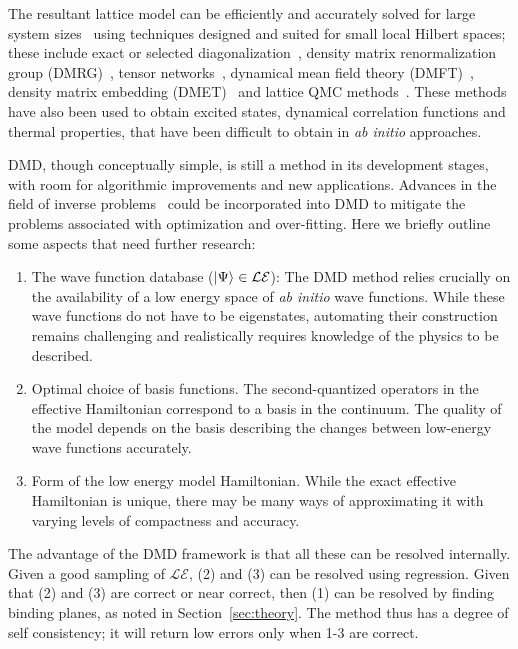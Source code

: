 \documentclass[aps, prb, 11pt]{revtex4-1}
\begin{document}
The resultant lattice model can be efficiently and accurately solved for large system sizes~\cite{LeBlanc_PRX} using techniques designed and suited for small local Hilbert spaces; these include exact or selected diagonalization~\cite{DeRaedt,Tubman_selci,Holmes_Tubman_Umrigar}, density matrix renormalization group (DMRG)~\cite{White1992}, tensor networks~\cite{PEPS,Changlani_CPS,NeuscammanCPS}, dynamical mean field theory (DMFT)~\cite{Kotliar2006}, density matrix embedding (DMET)~\cite{DMET_2012} and lattice QMC methods~\cite{Scalapino, Trivedi_Ceperley, Zhang_AFQMC, Sandvik_loops, Prokofiev, 
Booth2009,SQMC,Holmes_Changlani_Umrigar, Booth2013}. 
These methods have also been used to obtain excited states, dynamical correlation functions and thermal properties, that have been difficult to obtain in \textit{ab initio} approaches. 


DMD, though conceptually simple, is still a method in its development stages, with room for algorithmic improvements and new applications. 
Advances in the field of inverse problems~\cite{Berg2017} could be incorporated into DMD to 
mitigate the problems associated with optimization and over-fitting. 
Here we briefly outline some aspects that need further research:
\begin{enumerate}
	\item The wave function database ($\ket{\Psi} \in \mathcal{LE}$):
	The DMD method relies crucially on the availability of a low energy space of \textit{ab initio} wave functions. While these wave functions do not have to be eigenstates, automating their construction remains challenging and realistically requires knowledge of the physics to be described.
	\item Optimal choice of basis functions. The second-quantized operators in the effective Hamiltonian correspond to a basis in the continuum. The quality of the model depends on the basis describing the changes between low-energy wave functions accurately.
	\item Form of the low energy model Hamiltonian. While the exact effective Hamiltonian is unique, there may be many ways of approximating it with varying levels of compactness and accuracy.
\end{enumerate} 
The advantage of the DMD framework is that all these can be resolved internally.
Given a good sampling of $\mathcal{LE}$, (2) and (3) can be resolved using regression. 
Given that (2) and (3) are correct or near correct, then (1) can be resolved by finding binding planes, as noted in Section~\ref{sec:theory}.
The method thus has a degree of self consistency; it will return low errors only when 1-3 are correct.
\end{document}
